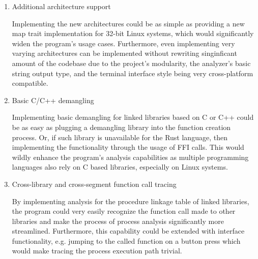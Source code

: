 \begin{enumerate}
    \item{Additional architecture support}

    Implementing the new architectures could be as simple as providing a new map trait implementation for 32-bit Linux systems, which would significantly widen the program's usage cases.
    Furthermore, even implementing very varying architectures can be implemented without rewriting singinficant amount of the codebase due to the project's modularity, the analyzer's basic string output type, and the terminal interface style being very cross-platform compatible.
    
    \item {Basic C/C++ demangling}

    Implementing basic demangling for linked libraries based on C or C++ could be as easy as plugging a demangling library into the function creation process.
    Or, if such library is unavailable for the Rust language, then implementing the functionality through the usage of FFI calls.
    This would wildly enhance the program's analysis capabilities as multiple programming languages also rely on C based libraries, especially on Linux systems.

    \item {Cross-library and cross-segment function call tracing}

    By implementing analysis for the procedure linkage table of linked libraries, the program could very easily recognize the function call made to other libraries and make the process of process analysis significantly more streamlined.
    Furthermore, this capability could be extended with interface functionality, e.g. jumping to the called function on a button press which would make tracing the process execution path trivial.
    
\end{enumerate}
